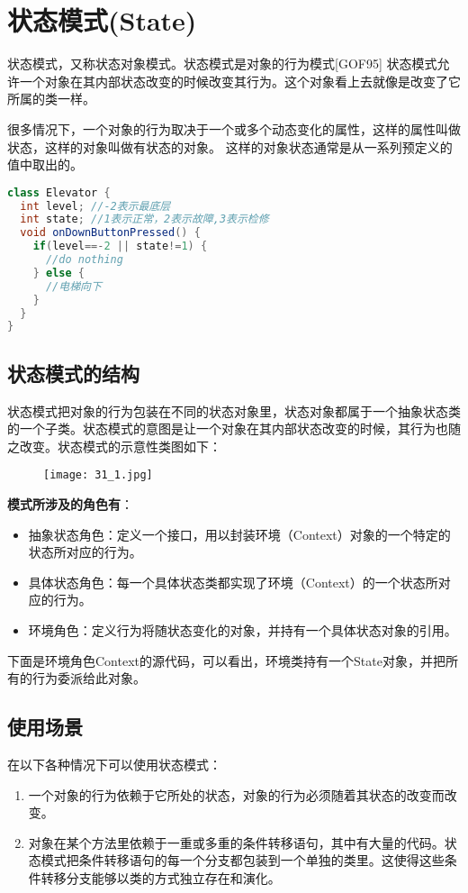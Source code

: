 \documentclass[../main.tex]{subfiles}
\begin{document}
\section{状态模式(State)}
状态模式，又称状态对象模式。状态模式是对象的行为模式[GOF95]
状态模式允许一个对象在其内部状态改变的时候改变其行为。这个对象看上去就像是改变了它所属的类一样。

很多情况下，一个对象的行为取决于一个或多个动态变化的属性，这样的属性叫做状态，这样的对象叫做有状态的对象。
这样的对象状态通常是从一系列预定义的值中取出的。
%
\begin{lstlisting}[language=java]
class Elevator {
  int level; //-2表示最底层
  int state; //1表示正常，2表示故障,3表示检修
  void onDownButtonPressed() {
    if(level==-2 || state!=1) {
      //do nothing
    } else {
      //电梯向下
    }
  }
}
\end{lstlisting}
%
\subsection{状态模式的结构}
状态模式把对象的行为包装在不同的状态对象里，状态对象都属于一个抽象状态类的一个子类。状态模式的意图是让一个对象在其内部状态改变的时候，其行为也随之改变。状态模式的示意性类图如下：
%
\begin{figure}[H]
  \texttt{[image: 31\_1.jpg]}
\end{figure}
%
\textbf{模式所涉及的角色有}：
\begin{itemize}
  \item 抽象状态角色：定义一个接口，用以封装环境（Context）对象的一个特定的状态所对应的行为。
  \item 具体状态角色：每一个具体状态类都实现了环境（Context）的一个状态所对应的行为。
  \item 环境角色：定义行为将随状态变化的对象，并持有一个具体状态对象的引用。
\end{itemize}
%
下面是环境角色Context的源代码，可以看出，环境类持有一个State对象，并把所有的行为委派给此对象。
%



%
\subsection{使用场景}
在以下各种情况下可以使用状态模式：
%
\begin{enumerate}
  \item 一个对象的行为依赖于它所处的状态，对象的行为必须随着其状态的改变而改变。
  \item 对象在某个方法里依赖于一重或多重的条件转移语句，其中有大量的代码。状态模式把条件转移语句的每一个分支都包装到一个单独的类里。这使得这些条件转移分支能够以类的方式独立存在和演化。
\end{enumerate}
%
\end{document}
